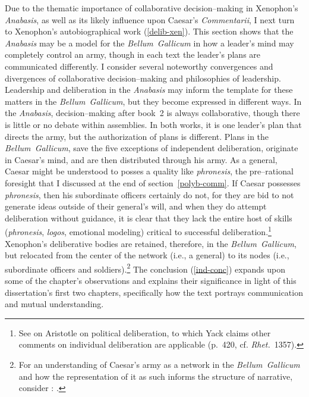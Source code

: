 \documentclass[12pt,letterpaper,oneside,final]{memoir}
\begin{document}
Due to the thematic importance of collaborative decision--making in Xenophon's \emph{Anabasis}, as well as its likely influence upon Caesar's \emph{Commentarii}, I next turn to Xenophon's autobiographical work (\ref{delib-xen}). This section shows that the \emph{Anabasis} may be a model for the \emph{Bellum~Gallicum} in how a leader's mind may completely control an army, though in each text the leader's plans are communicated differently. I consider several noteworthy convergences and divergences of collaborative decision--making and philosophies of leadership. Leadership and deliberation in the \emph{Anabasis} may inform the template for these matters in the \emph{Bellum~Gallicum}, but they become expressed in different ways. In the \emph{Anabasis}, decision--making after book~2 is always collaborative, though there is little or no debate within assemblies. In both works, it is one leader's plan that directs the army, but the authorization of plans is different. Plans in the \emph{Bellum~Gallicum}, save the five exceptions of independent deliberation, originate in Caesar's mind, and are then distributed through his army. As a general, Caesar might be understood to posses a quality like \emph{phronesis}, the pre--rational foresight that I discussed at the end of section~\ref{polyb-comm}. If Caesar possesses \emph{phronesis}, then his subordinate officers certainly do not, for they are bid to not generate ideas outside of their general's will, and when they do attempt deliberation without guidance, it is clear that they lack the entire host of skills (\emph{phronesis}, \emph{logos}, emotional modeling) critical to successful deliberation.\footnote{See \textcite[419--426]{yack2006} on Aristotle on political deliberation, to which Yack claims other comments on individual deliberation are applicable (p.~420, cf. \emph{Rhet.}~1357).} Xenophon's deliberative bodies are retained, therefore, in the \emph{Bellum~Gallicum}, but relocated from the center of the network (i.e., a general) to its nodes (i.e., subordinate officers and soldiers).\footnote{For an understanding of Caesar's army as a network in the \emph{Bellum~Gallicum} and how the representation of it as such informs the structure of narrative, consider \textcite[49--56]{rambaud1966}: .} The conclusion (\ref{ind-conc}) expands upon some of the chapter's observations and explains their significance in light of this dissertation's first two chapters, specifically how the text portrays communication and mutual understanding.
\end{document}

